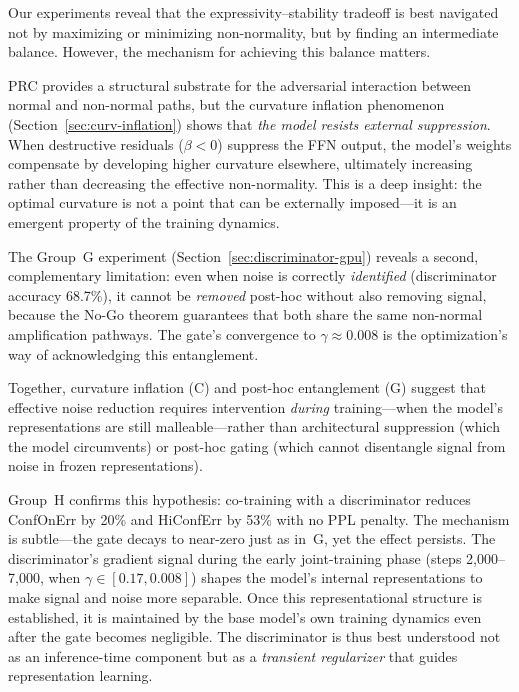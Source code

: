 \documentclass[11pt,a4paper]{article}
\theoremstyle{definition}
\begin{document}
Our experiments reveal that the expressivity--stability
tradeoff is best navigated not by maximizing or minimizing
non-normality, but by finding an intermediate balance.
However, the mechanism for achieving this balance matters.

PRC provides a structural substrate for the adversarial
interaction between normal and non-normal paths, but the
curvature inflation phenomenon (Section~\ref{sec:curv-inflation})
shows that \emph{the model resists external suppression}. When
destructive residuals ($\beta < 0$) suppress the FFN output,
the model's weights compensate by developing higher curvature
elsewhere, ultimately increasing rather than decreasing the
effective non-normality. This is a deep insight: the optimal
curvature is not a point that can be externally imposed---it is
an emergent property of the training dynamics.

The Group~G experiment (Section~\ref{sec:discriminator-gpu})
reveals a second, complementary limitation: even when noise
is correctly \emph{identified} (discriminator accuracy 68.7\%),
it cannot be \emph{removed} post-hoc without also removing
signal, because the No-Go theorem guarantees that both share
the same non-normal amplification pathways. The gate's
convergence to $\gamma \approx 0.008$ is the optimization's
way of acknowledging this entanglement.

Together, curvature inflation (C) and post-hoc entanglement (G)
suggest that effective noise reduction requires intervention
\emph{during} training---when the model's representations are
still malleable---rather than architectural suppression (which
the model circumvents) or post-hoc gating (which cannot
disentangle signal from noise in frozen representations).

Group~H confirms this hypothesis: co-training with a discriminator
reduces ConfOnErr by 20\% and HiConfErr by 53\% with no PPL
penalty. The mechanism is subtle---the gate decays to near-zero
just as in~G, yet the effect persists. The discriminator's
gradient signal during the early joint-training phase (steps
2{,}000--7{,}000, when $\gamma \in [0.17, 0.008]$) shapes the
model's internal representations to make signal and noise more
separable. Once this representational structure is established,
it is maintained by the base model's own training dynamics even
after the gate becomes negligible. The discriminator is thus
best understood not as an inference-time component but as a
\emph{transient regularizer} that guides representation learning.
\end{document}
